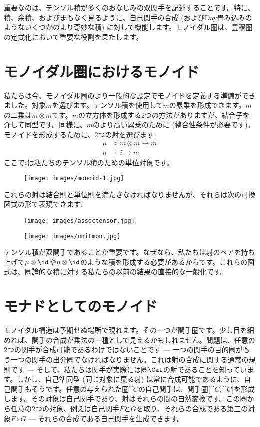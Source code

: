 重要なのは、テンソル積が多くのおなじみの双関手を記述することです。特に、積、余積、およびまもなく見るように、自己関手の合成 (およびDay畳み込みのようないくつかのより奇妙な積) に対して機能します。モノイダル圏は、豊穣圏の定式化において重要な役割を果たします。

\section{モノイダル圏におけるモノイド}

私たちは今、モノイダル圏のより一般的な設定でモノイドを定義する準備ができました。対象$m$を選びます。テンソル積を使用して$m$の累乗を形成できます。$m$の二乗は$m \otimes m$です。$m$の立方体を形成する2つの方法がありますが、結合子を介して同型です。同様に、$m$のより高い累乗のために (整合性条件が必要です)。モノイドを形成するために、2つの射を選びます: 
\begin{align*}
  \mu  & \Colon m \otimes m \to m \\
  \eta & \Colon i \to m
\end{align*}
ここで$i$は私たちのテンソル積のための単位対象です。

\begin{figure}[H]
  \centering
  \texttt{[image: images/monoid-1.jpg]}
\end{figure}

\noindent
これらの射は結合則と単位則を満たさなければなりませんが、それらは次の可換図式の形で表現できます: 

\begin{figure}[H]
  \centering
  \texttt{[image: images/assoctensor.jpg]}
\end{figure}

\begin{figure}[H]
  \centering
  \texttt{[image: images/unitmon.jpg]}
\end{figure}

\noindent
テンソル積が双関手であることが重要です。なぜなら、私たちは射のペアを持ち上げて$\mu \otimes \id$や$\eta \otimes \id$のような積を形成する必要があるからです。これらの図式は、圏論的な積に対する私たちの以前の結果の直接的な一般化です。

\section{モナドとしてのモノイド}

モノイダル構造は予期せぬ場所で現れます。その一つが関手圏です。少し目を細めれば、関手の合成が乗法の一種として見えるかもしれません。問題は、任意の2つの関手が合成可能であるわけではないことです --- 一つの関手の目的圏がもう一つの関手の出発圏でなければなりません。これは射の合成に関する通常の規則です --- そして、私たちは関手が実際には圏$\Cat$の射であることを知っています。しかし、自己準同型 (同じ対象に戻る射) は常に合成可能であるように、自己関手もそうです。任意の与えられた圏$\cat{C}$の自己関手は、関手圏${[}\cat{C}, \cat{C}{]}$を形成します。その対象は自己関手であり、射はそれらの間の自然変換です。この圏から任意の2つの対象、例えば自己関手$F$と$G$を取り、それらの合成である第三の対象$F \circ G$ --- それらの合成である自己関手を生成できます。

